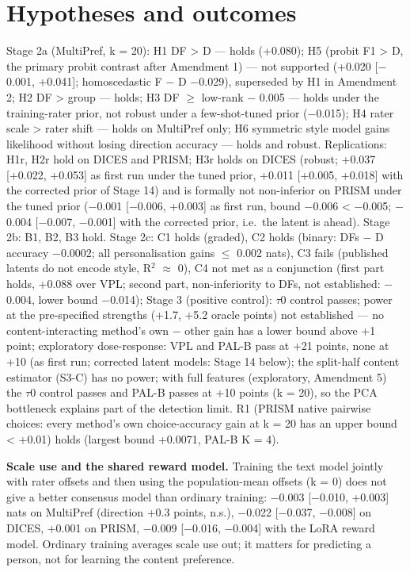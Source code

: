 \documentclass{article}
\begin{document}
\section{Hypotheses and outcomes}

Stage 2a (MultiPref, k = 20): H1 DF \textgreater{} D --- holds (+0.080); H5 (probit F1 \textgreater{} D, the primary probit contrast after Amendment 1) --- not supported (+0.020 {[}$-$0.001, +0.041{]}; homoscedastic F $-$ D $-$0.029), superseded by H1 in Amendment 2; H2 DF \textgreater{} group --- holds; H3 DF $\geq$ low-rank $-$ 0.005 --- holds under the training-rater prior, not robust under a few-shot-tuned prior ($-$0.015); H4 rater scale \textgreater{} rater shift --- holds on MultiPref only; H6 symmetric style model gains likelihood without losing direction accuracy --- holds and robust. Replications: H1r, H2r hold on DICES and PRISM; H3r holds on DICES (robust; +0.037 {[}+0.022, +0.053{]} as first run under the tuned prior, +0.011 {[}+0.005, +0.018{]} with the corrected prior of Stage 14) and is formally not non-inferior on PRISM under the tuned prior ($-$0.001 {[}$-$0.006, +0.003{]} as first run, bound $-$0.006 \textless{} $-$0.005; $-$0.004 {[}$-$0.007, $-$0.001{]} with the corrected prior, i.e.~the latent is ahead). Stage 2b: B1, B2, B3 hold. Stage 2c: C1 holds (graded), C2 holds (binary: \textbar DFs $-$ D\textbar{} accuracy $-$0.0002; all personalisation gains $\leq$ 0.002 nats), C3 fails (published latents do not encode style, R$^2$ $\approx$ 0), C4 not met as a conjunction (first part holds, +0.088 over VPL; second part, non-inferiority to DFs, not established: $-$0.004, lower bound $-$0.014); Stage 3 (positive control): $\tau$0 control passes; power at the pre-specified strengths (+1.7, +5.2 oracle points) not established --- no content-interacting method's own $-$ other gain has a lower bound above +1 point; exploratory dose-response: VPL and PAL-B pass at +21 points, none at +10 (as first run; corrected latent models: Stage 14 below); the split-half content estimator (S3-C) has no power; with full features (exploratory, Amendment 5) the $\tau$0 control passes and PAL-B passes at +10 points (k = 20), so the PCA bottleneck explains part of the detection limit. R1 (PRISM native pairwise choices: every method's own choice-accuracy gain at k = 20 has an upper bound \textless{} +0.01) holds (largest bound +0.0071, PAL-B K = 4).

\textbf{Scale use and the shared reward model.} Training the text model jointly with rater offsets and then using the population-mean offsets (k = 0) does not give a better consensus model than ordinary training: $-$0.003 {[}$-$0.010, +0.003{]} nats on MultiPref (direction +0.3 points, n.s.), $-$0.022 {[}$-$0.037, $-$0.008{]} on DICES, +0.001 on PRISM, $-$0.009 {[}$-$0.016, $-$0.004{]} with the LoRA reward model. Ordinary training averages scale use out; it matters for predicting a person, not for learning the content preference.
\end{document}
